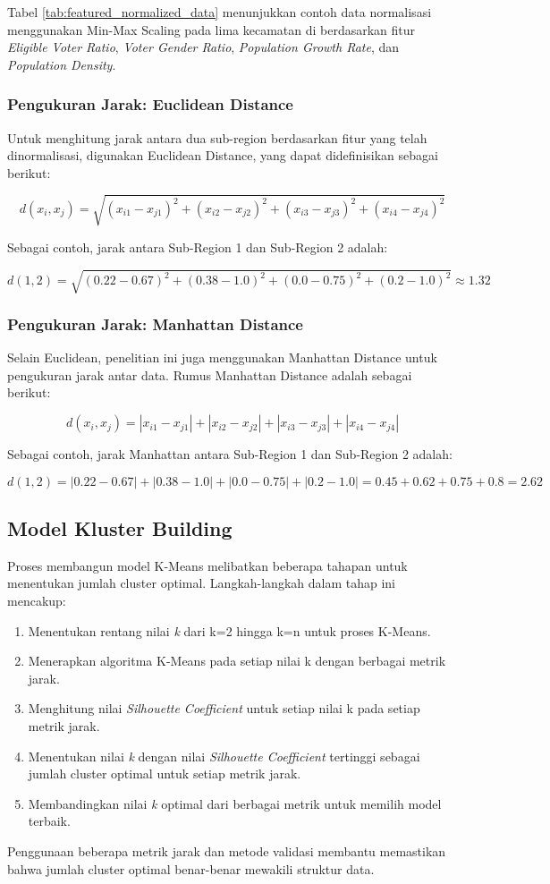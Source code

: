 

Tabel \ref{tab:featured_normalized_data} menunjukkan contoh data normalisasi menggunakan Min-Max Scaling pada lima kecamatan di berdasarkan fitur \textit{Eligible Voter Ratio}, \textit{Voter Gender Ratio}, \textit{Population Growth Rate}, dan \textit{Population Density}.

\subsubsection{Pengukuran Jarak: Euclidean Distance}
Untuk menghitung jarak antara dua sub-region berdasarkan fitur yang telah dinormalisasi, digunakan Euclidean Distance, yang dapat didefinisikan sebagai berikut:

\[
d(x_i, x_j) = \sqrt{(x_{i1} - x_{j1})^2 + (x_{i2} - x_{j2})^2 + (x_{i3} - x_{j3})^2 + (x_{i4} - x_{j4})^2}
\]

Sebagai contoh, jarak antara Sub-Region 1 dan Sub-Region 2 adalah:

\[
d(1,2) = \sqrt{(0.22 - 0.67)^2 + (0.38 - 1.0)^2 + (0.0 - 0.75)^2 + (0.2 - 1.0)^2} \approx 1.32
\]

\subsubsection{Pengukuran Jarak: Manhattan Distance}
Selain Euclidean, penelitian ini juga menggunakan Manhattan Distance untuk pengukuran jarak antar data. Rumus Manhattan Distance adalah sebagai berikut:

\[
d(x_i, x_j) = |x_{i1} - x_{j1}| + |x_{i2} - x_{j2}| + |x_{i3} - x_{j3}| + |x_{i4} - x_{j4}|
\]

Sebagai contoh, jarak Manhattan antara Sub-Region 1 dan Sub-Region 2 adalah:

\[
d(1,2) = |0.22 - 0.67| + |0.38 - 1.0| + |0.0 - 0.75| + |0.2 - 1.0| = 0.45 + 0.62 + 0.75 + 0.8 = 2.62
\]

\subsection{Model Kluster Building}
Proses membangun model K-Means melibatkan beberapa tahapan untuk menentukan jumlah cluster optimal. Langkah-langkah dalam tahap ini mencakup:
\begin{enumerate}
    \item Menentukan rentang nilai \textit{k} dari k=2 hingga k=n untuk proses K-Means.
    \item Menerapkan algoritma K-Means pada setiap nilai k dengan berbagai metrik jarak.
    \item Menghitung nilai \textit{Silhouette Coefficient} untuk setiap nilai k pada setiap metrik jarak.
    \item Menentukan nilai \textit{k} dengan nilai \textit{Silhouette Coefficient} tertinggi sebagai jumlah cluster optimal untuk setiap metrik jarak.
    \item Membandingkan nilai \textit{k} optimal dari berbagai metrik untuk memilih model terbaik.
\end{enumerate}
Penggunaan beberapa metrik jarak dan metode validasi membantu memastikan bahwa jumlah cluster optimal benar-benar mewakili struktur data.

